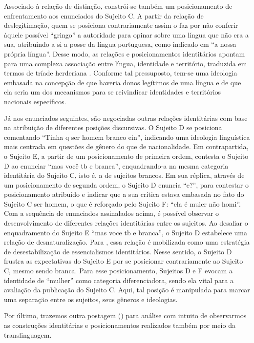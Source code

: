 \documentclass[portuguese]{textolivre}
\begin{document}
Associado à relação de distinção, constrói-se também um posicionamento de enfrentamento aos enunciados do Sujeito C. A partir da relação de deslegitimação, quem se posiciona contrariamente assim o faz por não conferir àquele possível “gringo” a autoridade para opinar sobre uma língua que não era a sua, atribuindo a si a posse da língua portuguesa, como indicado em “a nossa própria língua”. Desse modo, as relações e posicionamentos identitários apontam para uma complexa associação entre língua, identidade e território, traduzida em termos de tríade herderiana \cite{canagarajah_translingual_2013}. Conforme tal pressuposto, tem-se uma ideologia embasada na concepção de que haveria donos legítimos de uma língua e de que ela seria um dos mecanismos para se reivindicar identidades e territórios nacionais específicos.

Já nos enunciados seguintes, são negociadas outras relações identitárias com base na atribuição de diferentes posições discursivas. O Sujeito D se posiciona comentando “Tinha q ser homem branco ein”, indicando uma ideologia linguística mais centrada em questões de gênero do que de nacionalidade. Em contrapartida, o Sujeito E, a partir de um posicionamento de primeira ordem, contesta o Sujeito D ao enunciar “mas você tb e branca”, enquadrando-a na mesma categoria identitária do Sujeito C, isto é, a de sujeitos brancos. Em sua réplica, através de um posicionamento de segunda ordem, o Sujeito D enuncia “e?”, para contestar o posicionamento atribuído e indicar que a sua crítica estava embasada no fato do Sujeito C ser homem, o que é reforçado pelo Sujeito F: “ela é muier não homi”. Com a sequência de enunciados assinalados acima, é possível observar o desenvolvimento de diferentes relações identitárias entre os sujeitos. Ao desafiar o enquadramento do Sujeito E “mas voce tb e branca”, o Sujeito D estabelece uma relação de desnaturalização. Para \textcite{bucholtz_language_2004}, essa relação é mobilizada como uma estratégia de desestabilização de essencialismos identitários. Nesse sentido, o Sujeito D frustra as expectativas do Sujeito E por se posicionar contrariamente ao Sujeito C, mesmo sendo branca. Para esse posicionamento, Sujeitos D e F evocam a identidade de “mulher” como categoria diferenciadora, sendo ela vital para a avaliação da publicação do Sujeito C. Aqui, tal posição é manipulada para marcar uma separação entre os sujeitos, seus gêneros e ideologias.

Por último, trazemos outra postagem () para análise com intuito de observarmos as construções identitárias e posicionamentos realizados também por meio da translinguagem.
\end{document}
